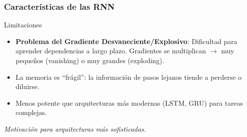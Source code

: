 \documentclass[handout]{beamer}
\begin{document}
\begin{frame}
    \frametitle{Características de las RNN}
    \begin{alertblock}{Limitaciones}
        \begin{itemize}
            \item \textbf{Problema del Gradiente Desvaneciente/Explosivo}: Dificultad para aprender dependencias a largo plazo. Gradientes se multiplican $\rightarrow$ muy pequeños (vanishing) o muy grandes (exploding).
            \item La memoria es ``frágil'': la información de pasos lejanos tiende a perderse o diluirse.
            \item Menos potente que arquitecturas más modernas (LSTM, GRU) para tareas complejas.
        \end{itemize}
    \end{alertblock}
    \begin{center} \bigskip
        \textit{Motivación para arquitecturas más sofisticadas.} %
    \end{center}
\end{frame}
\end{document}
